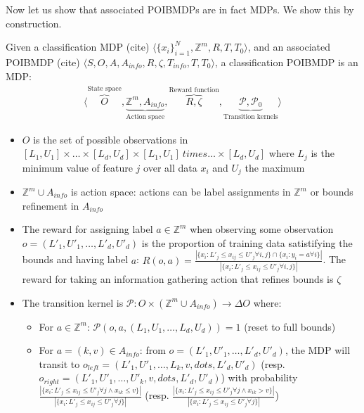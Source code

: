 Now let us show that associated POIBMDPs are in fact MDPs. We show this by construction.

\begin{definition}
    Given a classification MDP (cite) $\langle {\{x_i\}}_{i=1}^N, \mathbb{Z}^m, R, T, T_0 \rangle$, and an associated POIBMDP (cite) $\langle S, O, A, A_{info}, R, \zeta, T_{info}, T, T_0\rangle$, a classification POIBMDP is an MDP:
    \begin{align*}
        \langle \overbrace{O}^{\text{State space}}, \underbrace{\mathbb{Z}^m, A_{info}}_{\text{Action space}}, \overbrace{R, \zeta}^{\text{Reward function}}, \underbrace{\mathcal{P}, \mathcal{P}_0}_{\text{Transition kernels}} \rangle
    \end{align*}
    \begin{itemize}
        \item $O$ is the set of possible observations in $[L_1, U_1] \times \dots \times [L_d, U_d] \times [L_1, U_1] \ times \dots \times [L_d, U_d] $ where $L_j$ is the minimum value of feature $j$ over all data $x_i$ and $U_j$ the maximum
        \item $\mathbb{Z}^m \cup A_{info}$ is action space: actions can be label assignments in $\mathbb{Z}^m$ or bounds refinement in $A_{info}$
        \item The reward for assigning label $a\in \mathbb{Z}^m$ when observing some observation $o=(L'_1, U'_1, \dots, L'_d, U'_d)$ is the proportion of training data satistifying the bounds and having label $a$: $R(o, a) = \frac{|\{x_i: L'_j \leq x_{ij} \leq U'_j \forall i,j \} \cap \{x_i: y_i = a \forall i \}|}{|\{x_i: L'_j \leq x_{ij} \leq U'_j \forall i,j \}|}$. 
        The reward for taking an information gathering action that refines bounds is $\zeta$
        \item The transition kernel is $\mathcal{P}:O \times (\mathbb{Z}^m \cup A_{info}) \rightarrow \Delta O$ where:
        \begin{itemize}
            \item For $a \in \mathbb{Z}^m$: $\mathcal{P}(o, a, (L_1, U_1, \dots, L_d, U_d)) = 1$ (reset to full bounds)
            \item For $a = (k, v) \in A_{info}$: from $o=(L'_1, U'_1, \dots, L'_d, U'_d)$, the MDP will transit to $o_{left} = (L'_1, U'_1, \dots, L_k, v, dots, L'_d, U'_d)$ (resp. $o_{right} = (L'_1, U'_1, \dots, U'_k, v, dots, L'_d, U'_d)$) with probability $\frac{|\{x_i: L'_j \leq x_{ij} \leq U'_j \forall j \land x_{ik} \leq v\}|}{|\{x_i: L'_j \leq x_{ij} \leq U'_j \forall j\}|}$ (resp. $\frac{|\{x_i: L'_j \leq x_{ij} \leq U'_j \forall j \land x_{ik} > v\}|}{|\{x_i: L'_j \leq x_{ij} \leq U'_j \forall j\}|}$)
        \end{itemize}
    \end{itemize}
\end{definition}

